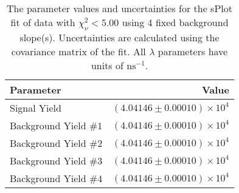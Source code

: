 
\begin{table}
    \begin{center}
        \begin{tabular}{lr}\toprule
            Parameter & Value \\\midrule
            Signal Yield & $(4.04146 \pm 0.00010) \times 10^{4}$ \\
            Background Yield $\#1$ & $(4.04146 \pm 0.00010) \times 10^{4}$ \\
            Background Yield $\#2$ & $(4.04146 \pm 0.00010) \times 10^{4}$ \\
            Background Yield $\#3$ & $(4.04146 \pm 0.00010) \times 10^{4}$ \\
            Background Yield $\#4$ & $(4.04146 \pm 0.00010) \times 10^{4}$ \\\bottomrule
        \end{tabular}
        \caption{The parameter values and uncertainties for the sPlot fit of data with $\chi^2_\nu < 5.00$ using 4 fixed background slope(s). Uncertainties are calculated using the covariance matrix of the fit. All $\lambda$ parameters have units of $\si{\nano\second}^{-1}$.}
    \end{center}
\end{table}
